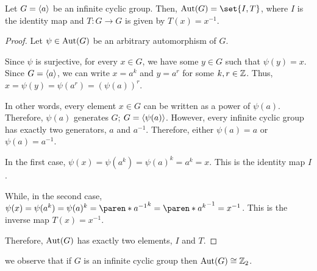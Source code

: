\documentclass[11pt]{penrose}
\begin{document}
\begin{nthm}
    Let $G = \langle a\rangle$ be an infinite cyclic group. Then, $\Aut(G) = \set{I,T}$, where $I$ is the identity map and $T:G \to G$ is given by $T(x) = x^{-1}$.
\end{nthm}
\begin{proof}
    Let $\psi \in \operatorname{Aut}(G)$ be an arbitrary automorphism of $G$.

    Since $\psi$ is surjective, for every $x \in G$, we have some $y \in G$ such that $\psi(y) = x$. Since $G = \langle a\rangle$, we can write $x = a^{k}$ and $y = a^{r}$ for some $k, r \in \mathbb{Z}$. Thus, $x = \psi(y) = \psi(a^{r}) = (\psi(a))^{r}$.

    In other words, every element $x \in G$ can be written as a power of $\psi(a)$. Therefore, $\psi(a)$ generates $G$; $G = \langle\psi(a)\rangle$. However, every infinite cyclic group has exactly two generators, $a$ and $a^{-1}$. Therefore, either $\psi(a) = a$ or $\psi(a) = a^{-1}$.

    In the first case, $\psi(x) = \psi(a^{k}) = \psi(a)^{k} = a^{k} = x$. This is the identity map $I$.

    While, in the second case, $\psi(x) = \psi(a^{k}) = \psi(a)^{k} = \paren*{a^{-1}}^{k} = \paren*{a^{k}}^{-1} = x^{-1}$. This is the inverse map $T(x) = x^{-1}$.

    Therefore, $\operatorname{Aut}(G)$ has exactly two elements, $I$ and $T$.
\end{proof}

\begin{remark}
    we observe that if $G$ is an infinite cyclic group then $\operatorname{Aut}(G) \mathrel{\cong} \mathbb{Z}_{2}$.
\end{remark}
\end{document}
